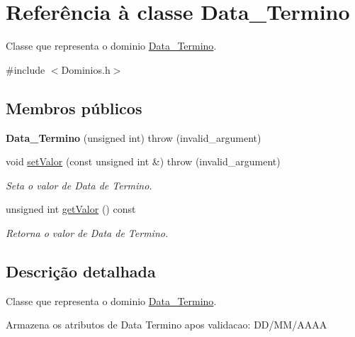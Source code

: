 \hypertarget{class_data___termino}{
\section{\-Referência à classe \-Data\-\_\-\-Termino}
\label{class_data___termino}
}


\-Classe que representa o dominio \hyperlink{class_data___termino}{\-Data\-\_\-\-Termino}.  




{\ttfamily \#include $<$\-Dominios.\-h$>$}

\subsection*{\-Membros públicos}
\begin{DoxyCompactItemize}
\item 
\hypertarget{class_data___termino_aba9f868e567e2d5c8c13197e77f1dc5c}{
{\bfseries \-Data\-\_\-\-Termino} (unsigned int)  throw (invalid\-\_\-argument)}
\label{class_data___termino_aba9f868e567e2d5c8c13197e77f1dc5c}

\item 
void \hyperlink{class_data___termino_a90fee567953e20e803b54da195132281}{set\-Valor} (const unsigned int \&)  throw (invalid\-\_\-argument)
\begin{DoxyCompactList}\small\item\em \-Seta o valor de \-Data de \-Termino. \end{DoxyCompactList}\item 
unsigned int \hyperlink{class_data___termino_ad5265c6ec1c563ed89f4fc9a6588ac8b}{get\-Valor} () const 
\begin{DoxyCompactList}\small\item\em \-Retorna o valor de \-Data de \-Termino. \end{DoxyCompactList}\end{DoxyCompactItemize}


\subsection{\-Descrição detalhada}
\-Classe que representa o dominio \hyperlink{class_data___termino}{\-Data\-\_\-\-Termino}. 

\-Armazena os atributos de \-Data \-Termino apos validacao\-: \-D\-D/\-M\-M/\-A\-A\-A\-A 

